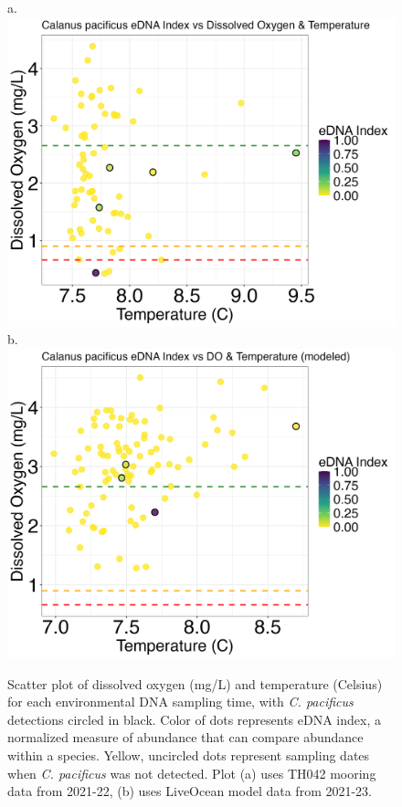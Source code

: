 \documentclass[12pt,twoside]{reedthesis}
\begin{document}
	
	\begin{figure}[!h]
		\begin{center}
			a. \includegraphics[scale=0.3]{Cpacificus_Scatter_noOut}
			b. \includegraphics[scale=0.3]{Cpacificus_Scatter_AllYr_mod_noOut}
			\caption[\textit{C. pacificus} scatterplot]{\footnotesize{Scatter plot of dissolved oxygen (mg/L) and temperature (Celsius) for each environmental DNA sampling time, with \textit{C. pacificus} detections circled in black. Color of dots represents eDNA index, a normalized measure of abundance that can compare abundance within a species. Yellow, uncircled dots represent sampling dates when \textit{C. pacificus} was not detected. Plot (a) uses TH042 mooring data from 2021-22, (b) uses LiveOcean model data from 2021-23.}} %
			\label{CpacificusScatter}
		\end{center}
	\end{figure} 
	
\end{document}

